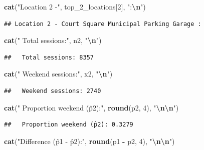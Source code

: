 \documentclass[
  12pt,
]{article}
\newenvironment{Shaded}{\begin{snugshade}}{\end{snugshade}}
\newcommand{\DecValTok}[1]{\textcolor[rgb]{0.00,0.00,0.81}{#1}}
\newcommand{\FunctionTok}[1]{\textcolor[rgb]{0.13,0.29,0.53}{\textbf{#1}}}
\newcommand{\NormalTok}[1]{#1}
\newcommand{\SpecialCharTok}[1]{\textcolor[rgb]{0.81,0.36,0.00}{\textbf{#1}}}
\newcommand{\StringTok}[1]{\textcolor[rgb]{0.31,0.60,0.02}{#1}}
\begin{document}
\begin{Shaded}
\begin{Highlighting}[]
\FunctionTok{cat}\NormalTok{(}\StringTok{"Location 2 {-}"}\NormalTok{, top\_2\_locations[}\DecValTok{2}\NormalTok{], }\StringTok{":}\SpecialCharTok{\textbackslash{}n}\StringTok{"}\NormalTok{)}
\end{Highlighting}
\end{Shaded}

\begin{verbatim}
## Location 2 - Court Square Municipal Parking Garage :
\end{verbatim}

\begin{Shaded}
\begin{Highlighting}[]
\FunctionTok{cat}\NormalTok{(}\StringTok{"  Total sessions:"}\NormalTok{, n2, }\StringTok{"}\SpecialCharTok{\textbackslash{}n}\StringTok{"}\NormalTok{)}
\end{Highlighting}
\end{Shaded}

\begin{verbatim}
##   Total sessions: 8357
\end{verbatim}

\begin{Shaded}
\begin{Highlighting}[]
\FunctionTok{cat}\NormalTok{(}\StringTok{"  Weekend sessions:"}\NormalTok{, x2, }\StringTok{"}\SpecialCharTok{\textbackslash{}n}\StringTok{"}\NormalTok{)}
\end{Highlighting}
\end{Shaded}

\begin{verbatim}
##   Weekend sessions: 2740
\end{verbatim}

\begin{Shaded}
\begin{Highlighting}[]
\FunctionTok{cat}\NormalTok{(}\StringTok{"  Proportion weekend (p̂2):"}\NormalTok{, }\FunctionTok{round}\NormalTok{(p2, }\DecValTok{4}\NormalTok{), }\StringTok{"}\SpecialCharTok{\textbackslash{}n\textbackslash{}n}\StringTok{"}\NormalTok{)}
\end{Highlighting}
\end{Shaded}

\begin{verbatim}
##   Proportion weekend (p̂2): 0.3279
\end{verbatim}

\begin{Shaded}
\begin{Highlighting}[]
\FunctionTok{cat}\NormalTok{(}\StringTok{"Difference (p̂1 {-} p̂2):"}\NormalTok{, }\FunctionTok{round}\NormalTok{(p1 }\SpecialCharTok{{-}}\NormalTok{ p2, }\DecValTok{4}\NormalTok{), }\StringTok{"}\SpecialCharTok{\textbackslash{}n\textbackslash{}n}\StringTok{"}\NormalTok{)}
\end{Highlighting}
\end{Shaded}
\end{document}
